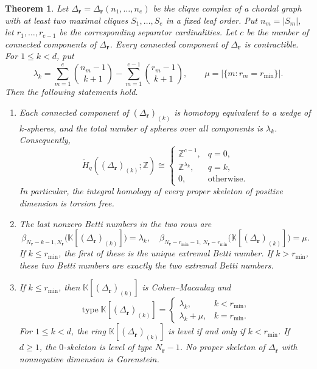 \documentclass[10pt,a4paper]{amsart}
\newtheorem{theorem}{Theorem}
\newcommand{\K}{\mathbb K}
\newcommand{\SR}[1]{\K[#1]}
\begin{document}
	\begin{theorem}\label{thm:3}
		Let $\Delta_{\mathbf r}=\Delta_{\mathbf r}(n_1,\ldots,n_e)$ be the clique complex of a chordal graph with at least two maximal cliques $S_1,\ldots,S_e$ in a fixed leaf order. Put $n_m=|S_m|$, let $r_1,\ldots,r_{e-1}$ be the corresponding separator cardinalities. Let $c$ be the number of connected components of $\Delta_{\mathbf r}$. Every connected component of $\Delta_{\mathbf r}$ is contractible. For $1\le k<d$, put
		\[
		\lambda_k=
		\sum_{m=1}^{e}\binom{n_m-1}{k+1}
		-
		\sum_{m=1}^{e-1}\binom{r_m-1}{k+1},
		\qquad
		\mu=\bigl|\{m:r_m=r_{\min}\}\bigr|.
		\]
		Then the following statements hold.
		\begin{enumerate}
			\item[(i)] Each connected component of $(\Delta_{\mathbf r})_{(k)}$ is homotopy equivalent to a wedge of $k$-spheres, and the total number of spheres over all components is $\lambda_k$. Consequently,
			\[
			\widetilde H_q((\Delta_{\mathbf r})_{(k)};\mathbb Z)
			\cong
			\begin{cases}
				\mathbb Z^{c-1},&q=0,\\
				\mathbb Z^{\lambda_k},&q=k,\\
				0,&\text{otherwise}.
			\end{cases}
			\]
			In particular, the integral homology of every proper skeleton of positive dimension is torsion free.
			
			\item[(ii)] The last nonzero Betti numbers in the two rows are
			\[
			\beta_{N_{\mathbf r}-k-1,N_{\mathbf r}}
			\bigl(\SR{(\Delta_{\mathbf r})_{(k)}}\bigr)=\lambda_k,\quad \beta_{N_{\mathbf r}-r_{\min}-1,\,N_{\mathbf r}-r_{\min}}
			\bigl(\SR{(\Delta_{\mathbf r})_{(k)}}\bigr)=\mu.
			\]
			If $k\le r_{\min}$, the first of these is the unique extremal Betti number. If $k>r_{\min}$, these two Betti numbers are exactly the two extremal Betti numbers.
			
			\item[(iii)] If $k\le r_{\min}$, then $\SR{(\Delta_{\mathbf r})_{(k)}}$ is Cohen--Macaulay and
			\[
			\operatorname{type}\SR{(\Delta_{\mathbf r})_{(k)}}
			=
			\begin{cases}
				\lambda_k,&k<r_{\min},\\
				\lambda_k+\mu,&k=r_{\min}.
			\end{cases}
			\]
			For $1\le k<d$, the ring $\SR{(\Delta_{\mathbf r})_{(k)}}$ is level if and only if $k<r_{\min}$. If $d\ge1$, the $0$-skeleton is level of type $N_{\mathbf r}-1$. No proper skeleton of $\Delta_{\mathbf r}$ with nonnegative dimension is Gorenstein.
		\end{enumerate}
	\end{theorem}
\end{document}

